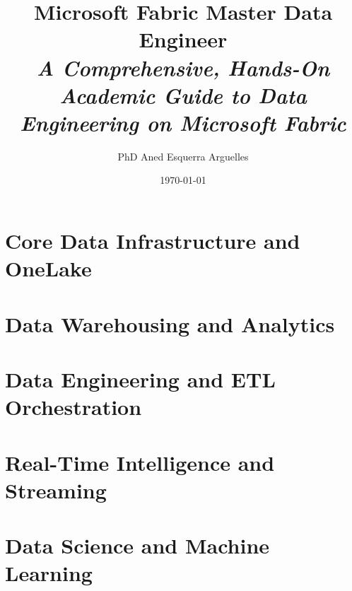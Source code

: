 \documentclass[11pt,a4paper,oneside]{book}
\title{\Huge \textbf{Microsoft Fabric Master Data Engineer}\\[1em]
\Large \textit{A Comprehensive, Hands-On Academic Guide to Data Engineering on Microsoft Fabric}}
\author{PhD Aned Esquerra Arguelles}
\date{\today}
\begin{document}
\frontmatter



\tableofcontents
\listoffigures
\listoftables

\mainmatter

\setcounter{chapter}{-1}


\part{Core Data Infrastructure and OneLake}




\part{Data Warehousing and Analytics}





\part{Data Engineering and ETL Orchestration}





\part{Real-Time Intelligence and Streaming}





\part{Data Science and Machine Learning}




\end{document}
